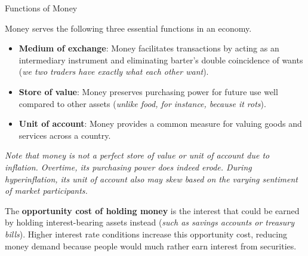 \documentclass[10pt]{article}
\begin{document}
    \begin{core}{Functions of Money}

      Money serves the following three essential functions in an economy.

      \begin{itemize}

        \item \textbf{Medium of exchange}: Money facilitates transactions by acting as an intermediary instrument and eliminating barter's double coincidence of wants (\textit{we two traders have exactly what each other want}).

        \item \textbf{Store of value}: Money preserves purchasing power for future use well compared to other assets (\textit{unlike food, for instance, because it rots}).

        \item \textbf{Unit of account}: Money provides a common measure for valuing goods and services across a country.

      \end{itemize}

      \textit{Note that money is not a perfect store of value or unit of account due to inflation. Overtime, its purchasing power does indeed erode. During hyperinflation, its unit of account also may skew based on the varying sentiment of market participants.}

      The \textbf{opportunity cost of holding money} is the interest that could be earned by holding interest-bearing assets instead (\textit{such as savings accounts or treasury bills}). Higher interest rate conditions increase this opportunity cost, reducing money demand because people would much rather earn interest from securities.

    \end{core}
\end{document}
